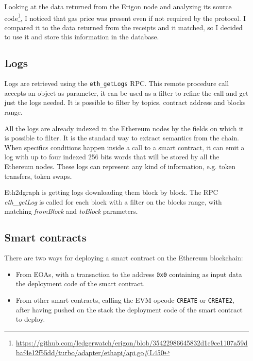 Looking at the data returned from the Erigon node and analyzing its source code\footnote{\url{https://github.com/ledgerwatch/erigon/blob/35422986645832d1c9ce1107a59dbaf4e12f55dd/turbo/adapter/ethapi/api.go\#L450}}, I noticed that gas price was present even if not required by the protocol. I compared it to the data returned from the receipts and it matched, so I decided to use it and store this information in the database.

\subsection{Logs}

Logs are retrieved using the \texttt{eth\_getLogs} RPC. This remote procedure call accepts an object as parameter, it can be used as a filter to refine the call and get just the logs needed. It is possible to filter by topics, contract address and blocks range. 

All the logs are already indexed in the Ethereum nodes by the fields on which it is possible to filter. It is the standard way to extract semantics from the chain. When specifics conditions happen inside a call to a smart contract, it can emit a log with up to four indexed 256 bits words that will be stored by all the Ethereum nodes. These logs can represent any kind of information, e.g. token transfers, token swaps.

Eth2dgraph is getting logs downloading them block by block. The RPC \textit{eth\_getLog} is called for each block with a filter on the blocks range, with matching \textit{fromBlock} and \textit{toBlock} parameters.

\subsection{Smart contracts}

There are two ways for deploying a smart contract on the Ethereum blockchain: 

\begin{itemize}
    \item From EOAs, with a transaction to the address \texttt{0x0} containing as input data the deployment code of the smart contract.
    \item From other smart contracts, calling the EVM opcode \texttt{CREATE} or \texttt{CREATE2}, after having pushed on the stack the deployment code of the smart contract to deploy.
\end{itemize}

